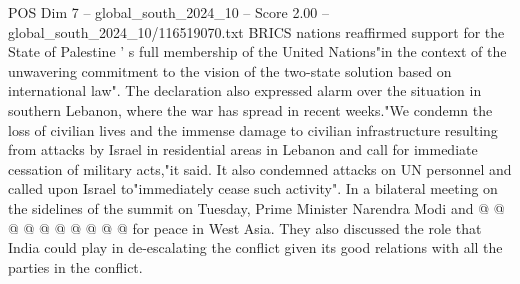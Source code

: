 \begin{textsample}{POS Dim 7 – global\_south\_2024\_10 – Score 2.00 – global\_south\_2024\_10/116519070.txt}
BRICS nations reaffirmed support for the State of Palestine ' s full membership of the United Nations"in the context of the unwavering commitment to the vision of the two-state solution based on international law".
The declaration also expressed alarm over the situation in southern Lebanon, where the war has spread in recent weeks."We condemn the loss of civilian lives and the immense damage to civilian infrastructure resulting from attacks by Israel in residential areas in Lebanon and call for immediate cessation of military acts,"it said.
It also condemned attacks on UN personnel and called upon Israel to"immediately cease such activity".
In a bilateral meeting on the sidelines of the summit on Tuesday, Prime Minister Narendra Modi and @ @ @ @ @ @ @ @ @ @ for peace in West Asia.
They also discussed the role that India could play in de-escalating the conflict given its good relations with all the parties in the conflict.

\end{textsample}
